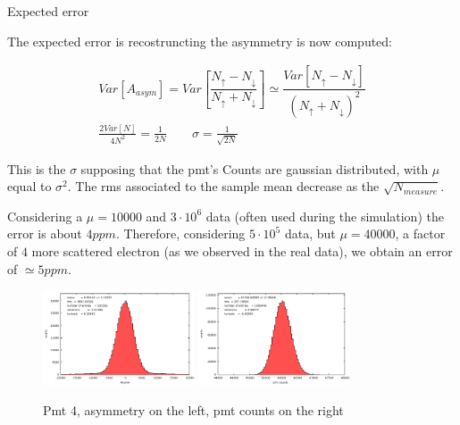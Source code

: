 \documentclass[8pt,a4paper]{beamer}
\begin{document}
\begin{frame}{Expected error}

The expected error is recostruncting the asymmetry is now computed:

\begin{gather*}
Var[A_{asym}] = Var[\dfrac{N_{\uparrow} - N_{\downarrow}}{ N_{\uparrow} + N_{\downarrow}}] \simeq \dfrac{Var[N_{\uparrow} - N_{\downarrow}]}{(N_{\uparrow} + N_{\downarrow})^{2}} \\
\frac{2Var[N]}{4N^{2}} = \frac{1}{2N} \qquad \sigma = \frac{1}{\sqrt{2N}}
\end{gather*}

This is the $\sigma$ supposing that the pmt's Counts are gaussian distributed, with $\mu$ equal to $\sigma^{2}$. The rms associated to the sample mean decrease as the $\sqrt{N_{measure}}$. 

Considering a $\mu = 10000$ and $3 \cdot 10^{6}$ data (often used during the simulation) the error is about $4 ppm$. Therefore, considering $5\cdot 10^{5}$ data, but $\mu = 40000$, a factor of $4$ more scattered electron (as we observed in the real data), we obtain an error of $\simeq 5ppm$.

\begin{figure}[hbtp]
\caption{Pmt 4, asymmetry on the left, pmt counts on the right}
\centering
\includegraphics[width = 0.4\textwidth]{figures/ASYM_A4.pdf}
\includegraphics[width = 0.4\textwidth]{figures/pmtA4.pdf} 
\end{figure}

\end{frame}
\end{document}
